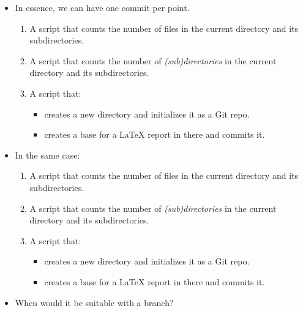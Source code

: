 \begin{frame}
  \begin{solution}
    \begin{itemize}
      \item In essence, we can have one commit per point.
        \begin{enumerate}
          \item A script that counts the number of files in the current 
            directory and its subdirectories.
          \item A script that counts the number of \emph{(sub)directories} in 
            the current directory and its subdirectories.
          \item A script that:
            \begin{itemize}
              \item creates a new directory and initializes it as a Git 
                repo.
              \item creates a base for a LaTeX report in there and commits 
                it.
            \end{itemize}
        \end{enumerate}
    \end{itemize}
  \end{solution}
\end{frame}

\begin{frame}
  \begin{exercise}
    \begin{itemize}
      \item In the same case:
        \begin{enumerate}
          \item A script that counts the number of files in the current 
            directory and its subdirectories.
          \item A script that counts the number of \emph{(sub)directories} in 
            the current directory and its subdirectories.
          \item A script that:
            \begin{itemize}
              \item creates a new directory and initializes it as a Git repo.
              \item creates a base for a LaTeX report in there and commits it.
            \end{itemize}
        \end{enumerate}
      \item When would it be suitable with a branch?
    \end{itemize}
  \end{exercise}
\end{frame}

